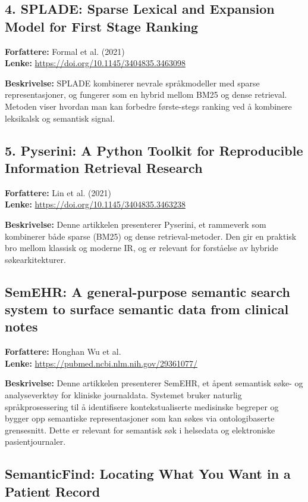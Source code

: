 \subsection*{4. SPLADE: Sparse Lexical and Expansion Model for First Stage Ranking}

\textbf{Forfattere:} Formal et al. (2021) \\
\textbf{Lenke:} \url{https://doi.org/10.1145/3404835.3463098}

\textbf{Beskrivelse:}  
SPLADE kombinerer nevrale språkmodeller med sparse representasjoner, og fungerer som en hybrid mellom BM25 og dense retrieval. Metoden viser hvordan man kan forbedre første-stegs ranking ved å kombinere leksikalsk og semantisk signal.

\subsection*{5. Pyserini: A Python Toolkit for Reproducible Information Retrieval Research}

\textbf{Forfattere:} Lin et al. (2021) \\
\textbf{Lenke:} \url{https://doi.org/10.1145/3404835.3463238}

\textbf{Beskrivelse:}  
Denne artikkelen presenterer Pyserini, et rammeverk som kombinerer både sparse (BM25) og dense retrieval-metoder. Den gir en praktisk bro mellom klassisk og moderne IR, og er relevant for forståelse av hybride søkearkitekturer.

\subsection*{SemEHR: A general-purpose semantic search system to surface semantic data from clinical notes}

\textbf{Forfattere:} Honghan Wu et al. \\
\textbf{Lenke:} \url{https://pubmed.ncbi.nlm.nih.gov/29361077/}

\textbf{Beskrivelse:}  
Denne artikkelen presenterer SemEHR, et åpent semantisk søke- og analyseverktøy for kliniske journaldata. Systemet bruker naturlig språkprosessering til å identifisere kontekstualiserte medisinske begreper og bygger opp semantiske representasjoner som kan søkes via ontologibaserte grensesnitt. Dette er relevant for semantisk søk i helsedata og elektroniske pasientjournaler. 

\subsection*{SemanticFind: Locating What You Want in a Patient Record}

